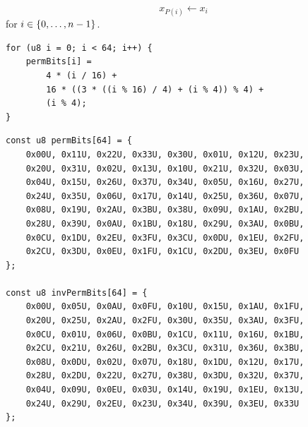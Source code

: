\[
x_{P(i)}\gets x_i
\] for $i\in\set{0,\dots,n-1}$.
\vspace{8pt}
\begin{lstlisting}[style=C]
for (u8 i = 0; i < 64; i++) {
	permBits[i] =
		4 * (i / 16) +
		16 * ((3 * ((i % 16) / 4) + (i % 4)) % 4) +
		(i % 4);
}
\end{lstlisting}
\begin{table}[h]
	\caption{Specifications of $\gift$-$64$ Bit Permutation}
	\label{table:gift-64-permbit}
\end{table}

\begin{lstlisting}[style=C]
const u8 permBits[64] = {
	0x00U, 0x11U, 0x22U, 0x33U, 0x30U, 0x01U, 0x12U, 0x23U, 
	0x20U, 0x31U, 0x02U, 0x13U, 0x10U, 0x21U, 0x32U, 0x03U, 
	0x04U, 0x15U, 0x26U, 0x37U, 0x34U, 0x05U, 0x16U, 0x27U, 
	0x24U, 0x35U, 0x06U, 0x17U, 0x14U, 0x25U, 0x36U, 0x07U, 
	0x08U, 0x19U, 0x2AU, 0x3BU, 0x38U, 0x09U, 0x1AU, 0x2BU, 
	0x28U, 0x39U, 0x0AU, 0x1BU, 0x18U, 0x29U, 0x3AU, 0x0BU, 
	0x0CU, 0x1DU, 0x2EU, 0x3FU, 0x3CU, 0x0DU, 0x1EU, 0x2FU, 
	0x2CU, 0x3DU, 0x0EU, 0x1FU, 0x1CU, 0x2DU, 0x3EU, 0x0FU
};

const u8 invPermBits[64] = {
	0x00U, 0x05U, 0x0AU, 0x0FU, 0x10U, 0x15U, 0x1AU, 0x1FU, 
	0x20U, 0x25U, 0x2AU, 0x2FU, 0x30U, 0x35U, 0x3AU, 0x3FU, 
	0x0CU, 0x01U, 0x06U, 0x0BU, 0x1CU, 0x11U, 0x16U, 0x1BU, 
	0x2CU, 0x21U, 0x26U, 0x2BU, 0x3CU, 0x31U, 0x36U, 0x3BU, 
	0x08U, 0x0DU, 0x02U, 0x07U, 0x18U, 0x1DU, 0x12U, 0x17U, 
	0x28U, 0x2DU, 0x22U, 0x27U, 0x38U, 0x3DU, 0x32U, 0x37U, 
	0x04U, 0x09U, 0x0EU, 0x03U, 0x14U, 0x19U, 0x1EU, 0x13U, 
	0x24U, 0x29U, 0x2EU, 0x23U, 0x34U, 0x39U, 0x3EU, 0x33U
};
\end{lstlisting}

